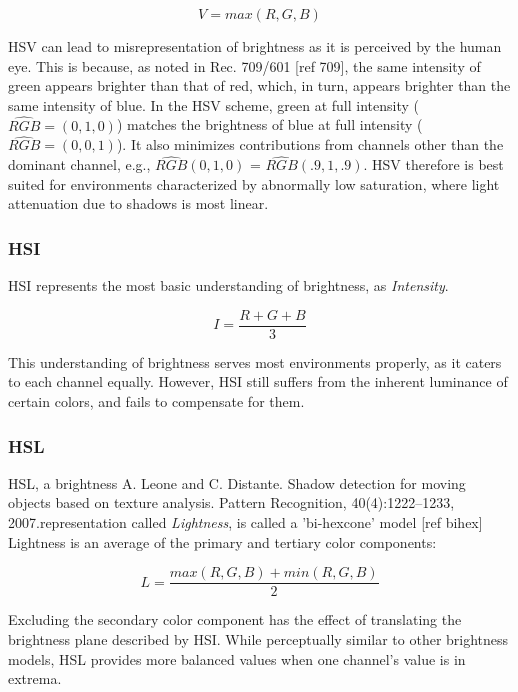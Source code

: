 \documentclass[12pt]{report}
\begin{document}
\begin{equation}
V = max(R, G, B)
\end{equation}

HSV can lead to misrepresentation of brightness as it is perceived by the human eye. This is because, as noted in Rec. 709/601 [ref 709], the same intensity of green appears brighter than that of red, which, in turn, appears brighter than the same intensity of blue. In the HSV scheme, green at full intensity ($\hat{RGB} = (0, 1, 0)$) matches the brightness of blue at full intensity ($\hat{RGB} = (0, 0, 1)$). It also minimizes contributions from channels other than the dominant channel, e.g., $\hat{RGB}(0, 1, 0)$ = $\hat{RGB}(.9, 1, .9)$. HSV therefore is best suited for environments characterized by abnormally low saturation, where light attenuation due to shadows is most linear.

\subsubsection{HSI}

HSI represents the most basic understanding of brightness, as \textit{Intensity}. 

\begin{equation}
I = \dfrac{R + G + B}{3}
\end{equation}

This understanding of brightness serves most environments properly, as it caters to each channel equally. However, HSI still suffers from the inherent luminance of certain colors, and fails to compensate for them.

\subsubsection{HSL}

HSL, a brightness A. Leone and C. Distante. Shadow detection for moving objects based on texture analysis. Pattern Recognition, 40(4):1222–1233,
2007.representation called \textit{Lightness}, is called a 'bi-hexcone' model [ref bihex] Lightness is an average of the primary and tertiary color components:

\begin{equation}
L = \dfrac{max(R,G,B) + min(R,G,B)}{2}
\end{equation}

Excluding the secondary color component has the effect of translating the brightness plane described by HSI. While perceptually similar to other brightness models, HSL provides more balanced values when one channel's value is in extrema.
\end{document}
